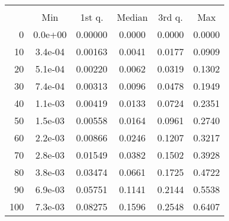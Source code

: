 \begin{tabular}{r|ccccc}
  \multicolumn{6}{c}{{\bf }} \\
  & Min & 1st q. & Median & 3rd q. & Max \\ \hline\hline
  0 & 0.0e+00 & 0.00000 & 0.0000 & 0.0000 & 0.0000
\\ 10 & 3.4e-04 & 0.00163 & 0.0041 & 0.0177 & 0.0909
\\ 20 & 5.1e-04 & 0.00220 & 0.0062 & 0.0319 & 0.1302
\\ 30 & 7.4e-04 & 0.00313 & 0.0096 & 0.0478 & 0.1949
\\ 40 & 1.1e-03 & 0.00419 & 0.0133 & 0.0724 & 0.2351
\\ 50 & 1.5e-03 & 0.00558 & 0.0164 & 0.0961 & 0.2740
\\ 60 & 2.2e-03 & 0.00866 & 0.0246 & 0.1207 & 0.3217
\\ 70 & 2.8e-03 & 0.01549 & 0.0382 & 0.1502 & 0.3928
\\ 80 & 3.8e-03 & 0.03474 & 0.0661 & 0.1725 & 0.4722
\\ 90 & 6.9e-03 & 0.05751 & 0.1141 & 0.2144 & 0.5538
\\ 100 & 7.3e-03 & 0.08275 & 0.1596 & 0.2548 & 0.6407
\end{tabular}
